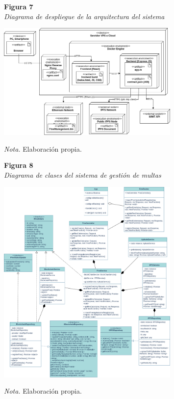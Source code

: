 \documentclass[
    letterpaper, 
    man,   
    spanish,
    12pt,
    donotrepeattitle,
    floatsintext,
    hidelinks %
]{apa7}
\begin{document}
\begin{figure}[htbp]
    \begin{flushleft}
        \textbf{Figura 7}\\
        \textit{Diagrama de despliegue de la arquitectura del sistema}
    \end{flushleft}
    \centering
    \includegraphics[width=0.8\textwidth]{Images/Despliegue.png}
    \vspace{0.5em}
    \begin{flushleft}
        \textit{Nota.} Elaboración propia.
    \end{flushleft}
    \label{fig:diagrama_despliegue}
\end{figure}

\begin{figure}[htbp]
    \begin{flushleft}
        \textbf{Figura 8}\\
        \textit{Diagrama de clases del sistema de gestión de multas}
    \end{flushleft}
    \centering
    \includegraphics[width=0.8\textwidth]{Images/uml.png}
    \vspace{0.5em}
    \begin{flushleft}
        \textit{Nota.} Elaboración propia.
    \end{flushleft}
    \label{fig:diagrama_clases}
\end{figure}
\end{document}

